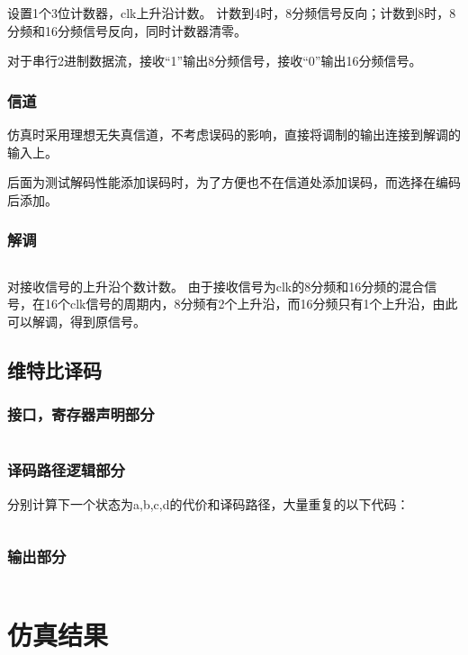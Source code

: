 \documentclass[UTF8]{ctexart}
\begin{document}
设置1个3位计数器，clk上升沿计数。
计数到4时，8分频信号反向；计数到8时，8分频和16分频信号反向，同时计数器清零。

对于串行2进制数据流，接收“1”输出8分频信号，接收“0”输出16分频信号。

\subsubsection{信道}

仿真时采用理想无失真信道，不考虑误码的影响，直接将调制的输出连接到解调的输入上。

后面为测试解码性能添加误码时，为了方便也不在信道处添加误码，而选择在编码后添加。

\subsubsection{解调}

\inputminted[linenos]{verilog}{../src/demodulator.v}

对接收信号的上升沿个数计数。
由于接收信号为clk的8分频和16分频的混合信号，在16个clk信号的周期内，8分频有2个上升沿，而16分频只有1个上升沿，由此可以解调，得到原信号。

\subsection{维特比译码}

\subsubsection{接口，寄存器声明部分}
\inputminted[linenos, firstline=7, lastline=26]{verilog}{../src/viterbi.v}

\subsubsection{译码路径逻辑部分}
分别计算下一个状态为a,b,c,d的代价和译码路径，大量重复的以下代码：
\inputminted[linenos, firstline=173, lastline=312]{verilog}{../src/viterbi.v}

\subsubsection{输出部分}
\inputminted[linenos, firstline=390, lastline=418]{verilog}{../src/viterbi.v}

\section{仿真结果}
\end{document}
